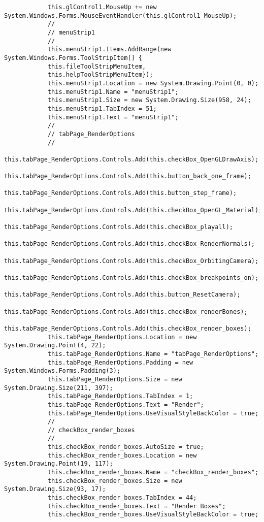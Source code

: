 \begin{scriptsize}
\begin{verbatim}
            this.glControl1.MouseUp += new System.Windows.Forms.MouseEventHandler(this.glControl1_MouseUp);
            // 
            // menuStrip1
            // 
            this.menuStrip1.Items.AddRange(new System.Windows.Forms.ToolStripItem[] {
            this.fileToolStripMenuItem,
            this.helpToolStripMenuItem});
            this.menuStrip1.Location = new System.Drawing.Point(0, 0);
            this.menuStrip1.Name = "menuStrip1";
            this.menuStrip1.Size = new System.Drawing.Size(958, 24);
            this.menuStrip1.TabIndex = 51;
            this.menuStrip1.Text = "menuStrip1";
            // 
            // tabPage_RenderOptions
            // 
            this.tabPage_RenderOptions.Controls.Add(this.checkBox_OpenGLDrawAxis);
            this.tabPage_RenderOptions.Controls.Add(this.button_back_one_frame);
            this.tabPage_RenderOptions.Controls.Add(this.button_step_frame);
            this.tabPage_RenderOptions.Controls.Add(this.checkBox_OpenGL_Material);
            this.tabPage_RenderOptions.Controls.Add(this.checkBox_playall);
            this.tabPage_RenderOptions.Controls.Add(this.checkBox_RenderNormals);
            this.tabPage_RenderOptions.Controls.Add(this.checkBox_OrbitingCamera);
            this.tabPage_RenderOptions.Controls.Add(this.checkBox_breakpoints_on);
            this.tabPage_RenderOptions.Controls.Add(this.button_ResetCamera);
            this.tabPage_RenderOptions.Controls.Add(this.checkBox_renderBones);
            this.tabPage_RenderOptions.Controls.Add(this.checkBox_render_boxes);
            this.tabPage_RenderOptions.Location = new System.Drawing.Point(4, 22);
            this.tabPage_RenderOptions.Name = "tabPage_RenderOptions";
            this.tabPage_RenderOptions.Padding = new System.Windows.Forms.Padding(3);
            this.tabPage_RenderOptions.Size = new System.Drawing.Size(211, 397);
            this.tabPage_RenderOptions.TabIndex = 1;
            this.tabPage_RenderOptions.Text = "Render";
            this.tabPage_RenderOptions.UseVisualStyleBackColor = true;
            // 
            // checkBox_render_boxes
            // 
            this.checkBox_render_boxes.AutoSize = true;
            this.checkBox_render_boxes.Location = new System.Drawing.Point(19, 117);
            this.checkBox_render_boxes.Name = "checkBox_render_boxes";
            this.checkBox_render_boxes.Size = new System.Drawing.Size(93, 17);
            this.checkBox_render_boxes.TabIndex = 44;
            this.checkBox_render_boxes.Text = "Render Boxes";
            this.checkBox_render_boxes.UseVisualStyleBackColor = true;

\end{verbatim}
\end{scriptsize}

